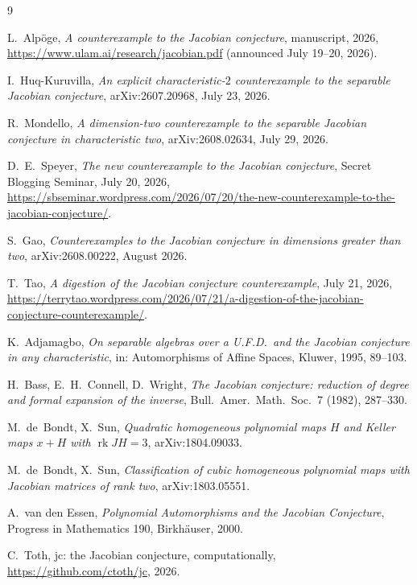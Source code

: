 \documentclass[11pt]{amsart}
\begin{document}
\begin{thebibliography}{9}

 L.~Alp\"oge, \emph{A counterexample to the Jacobian
conjecture}, manuscript, 2026,
\url{https://www.ulam.ai/research/jacobian.pdf} (announced July 19--20,
2026).

 I.~Huq-Kuruvilla, \emph{An explicit characteristic-$2$
counterexample to the separable Jacobian conjecture},
arXiv:2607.20968, July 23, 2026.

 R.~Mondello, \emph{A dimension-two counterexample
to the separable Jacobian conjecture in characteristic two},
arXiv:2608.02634, July 29, 2026.

 D.~E.~Speyer, \emph{The new counterexample to the Jacobian
conjecture}, Secret Blogging Seminar, July 20, 2026,
\url{https://sbseminar.wordpress.com/2026/07/20/the-new-counterexample-to-the-jacobian-conjecture/}.

 S.~Gao, \emph{Counterexamples to the Jacobian conjecture
in dimensions greater than two}, arXiv:2608.00222, August 2026.

 T.~Tao, \emph{A digestion of the Jacobian conjecture
counterexample}, July 21, 2026,
\url{https://terrytao.wordpress.com/2026/07/21/a-digestion-of-the-jacobian-conjecture-counterexample/}.

 K.~Adjamagbo, \emph{On separable algebras over a
U.F.D.\ and the Jacobian conjecture in any characteristic}, in:
Automorphisms of Affine Spaces, Kluwer, 1995, 89--103.

 H.~Bass, E.~H.~Connell, D.~Wright, \emph{The Jacobian
conjecture: reduction of degree and formal expansion of the inverse},
Bull.\ Amer.\ Math.\ Soc.\ 7 (1982), 287--330.

 M.~de~Bondt, X.~Sun, \emph{Quadratic homogeneous
polynomial maps $H$ and Keller maps $x+H$ with $\operatorname{rk} JH = 3$},
arXiv:1804.09033.

 M.~de~Bondt, X.~Sun, \emph{Classification of cubic
homogeneous polynomial maps with Jacobian matrices of rank two},
arXiv:1803.05551.

 A.~van den Essen, \emph{Polynomial Automorphisms and the
Jacobian Conjecture}, Progress in Mathematics 190, Birkh\"auser, 2000.

 C.~Toth, jc: the Jacobian conjecture, computationally,
\url{https://github.com/ctoth/jc}, 2026.

\end{thebibliography}
\end{document}
